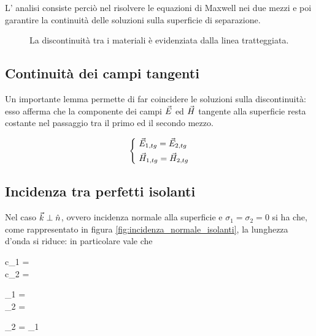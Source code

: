 L' analisi consiste perciò nel risolvere le equazioni di Maxwell nei due mezzi e poi garantire la continuità delle soluzioni sulla superficie di separazione.

\def\height{3}
\def\length{6}

\begin{figure}[h]
	\centering
	\caption{La discontinuità tra i materiali è evidenziata dalla linea tratteggiata.}
	\label{fig:discontinuita}
\end{figure}

\subsection{Continuità dei campi tangenti}
Un importante lemma permette di far coincidere le soluzioni sulla discontinuità: esso afferma che la componente dei campi $\vec{E}$ ed $\vec{H}$ tangente alla superficie resta costante nel passaggio tra il primo ed il secondo mezzo.

\begin{equation}
	\begin{dcases}
		~ \vec{E}_{1, tg} = \vec{E}_{2, tg} \\
		~ \vec{H}_{1, tg} = \vec{H}_{2, tg}
	\end{dcases}
\end{equation}

\subsection{Incidenza tra perfetti isolanti}
	Nel caso $\vec{k} \perp \hat{n}$, ovvero incidenza normale alla superficie e $\sigma_1 = \sigma_2 = 0$ si ha che, come rappresentato in figura \ref{fig:incidenza_normale_isolanti}, la lunghezza d'onda si riduce: in particolare vale che

	\begin{esp}
		\begin{dcases}
			c_1 =  \\
			c_2 = 
		\end{dcases}
		\implies
		\begin{dcases}
			\lambda_1 = \frac{\lambda_o}{n_1} \\
			\lambda_2 = \frac{\lambda_o}{n_2}
		\end{dcases}
		\implies
		\lambda_2 = \lambda_1 
	\end{esp}

